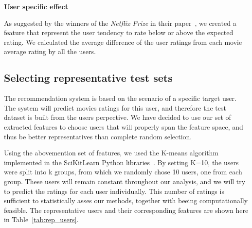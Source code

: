 \textbf{User specific effect}

As suggested by the winners of the \textit{Netflix Prize} in their paper~\cite{bell2007bellkor}, we created a feature that represent the user tendency to rate below or above the expected rating. We calculated the average difference of the user ratings from each movie average rating by all the users.

\subsection{Selecting representative test sets}
The recommendation system is based on the scenario of a specific target user. The system will predict movies ratings for this user, and therefore the test dataset is built from the users perpective. We have decided to use our set of extracted features to choose users that will properly span the feature space, and thus be better representatives than complete random selection. 

Using the abovemention set of features, we used the K-means algorithm implemented in the SciKitLearn Python libraries~\cite{pedregosa2011scikit}. By setting K=10, the users were split into k groups, from which we randomly chose 10 users, one from each group. These users will remain constant throughout our analysis, and we will try to predict the ratings for each user individually. This number of ratings is sufficient to statistically asses our methods, together with beeing computationally feasible. The representative users and their corresponding features are shown here in Table~\ref{tab:rep_users}.


